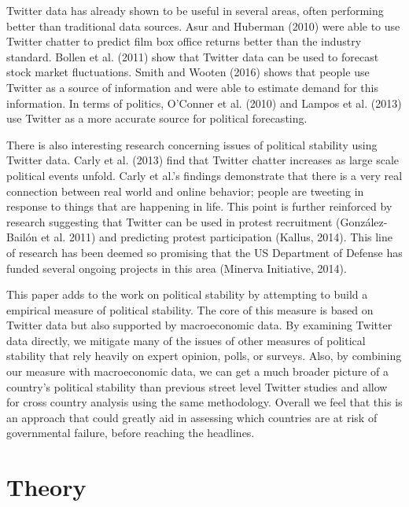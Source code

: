 \documentclass[12pt]{article}
\begin{document}
\begin{spacing}{1.5}
Twitter data has already shown to be useful in several areas, often performing better than traditional data sources. Asur and Huberman (2010) were able to use Twitter chatter to predict film box office returns better than the industry standard. Bollen et al. (2011) show that Twitter data can be used to forecast stock market fluctuations. Smith and Wooten (2016) shows that people use Twitter as a source of information and were able to estimate demand for this information. In terms of politics, O'Conner et al. (2010) and Lampos et al. (2013) use Twitter as a more accurate source for political forecasting. 

There is also interesting research concerning issues of political stability using Twitter data. Carly et al. (2013) find that Twitter chatter increases as large scale political events unfold. Carly et al.'s findings demonstrate that there is a very real connection between real world and online behavior; people are tweeting in response to things that are happening in life. This point is further reinforced by research suggesting that Twitter can be used in protest recruitment (Gonz{\'a}lez-Bail{\'o}n et al. 2011) and predicting protest participation (Kallus, 2014). This line of research has been deemed so promising that the US Department of Defense has funded several ongoing projects in this area (Minerva Initiative, 2014).  

This paper adds to the work on political stability by attempting to build a empirical measure of political stability. The core of this measure is based on Twitter data but also supported by macroeconomic data. By examining Twitter data directly, we mitigate many of the issues of other measures of political stability that rely heavily on expert opinion, polls, or surveys. Also, by combining our measure with macroeconomic data, we can get a much broader picture of a country's political stability than previous street level Twitter studies and allow for cross country analysis using the same methodology. Overall we feel that this is an approach that could greatly aid in assessing which countries are at risk of governmental failure, before reaching the headlines.      

\section*{Theory}



\end{spacing}
\end{document}
